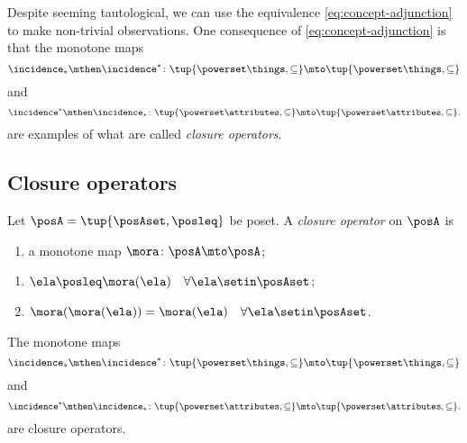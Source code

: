 Despite seeming tautological, we can use the equivalence \cref{eq:concept-adjunction} to make non-trivial observations. One consequence of \cref{eq:concept-adjunction} is that the monotone maps 
\begin{equation}
\incidence_* \mthen \incidence^* \colon \tup{\powerset \things, \subseteq} \mto \tup{\powerset \things, \subseteq}
\end{equation}
and 
\begin{equation}
\incidence^* \mthen \incidence_* \colon \tup{\powerset \attributes, \subseteq} \mto \tup{\powerset \attributes, \subseteq}.
\end{equation}
are examples of what are called \emph{closure operators}.


\subsection{Closure operators}

\begin{definition}
Let $\posA = \tup{\posAset, \posleq}$ be poset. A \emph{closure operator} on $\posA$ is

\constit
\begin{enumerate}
\item a monotone map $\mora \colon \posA \mto \posA$; 
\end{enumerate}

\condit
\begin{enumerate}
\item $\ela \posleq \mora(\ela) \quad \forall \ela \setin \posAset$;
\item  $\mora (\mora(\ela)) =  \mora(\ela) \quad \forall \ela \setin \posAset$. 
\end{enumerate}

\end{definition}

\begin{lemma}
The monotone maps 
\begin{equation}
\incidence_* \mthen \incidence^* \colon \tup{\powerset \things, \subseteq} \mto \tup{\powerset \things, \subseteq}
\end{equation}
and 
\begin{equation}
\incidence^* \mthen \incidence_* \colon \tup{\powerset \attributes, \subseteq} \mto \tup{\powerset \attributes, \subseteq}.
\end{equation}
are closure operators. 
\end{lemma}

